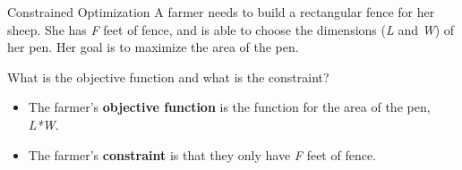 \documentclass{beamer}
\begin{document}
\begin{frame}{Constrained Optimization}
  A farmer needs to build a rectangular fence for her sheep. She has \textit{F} feet of fence, and is able to choose the dimensions (\textit{L} and \textit{W}) of her pen. Her goal is to maximize the area of the pen.

  \bigskip
  What is the objective function and what is the constraint?

  \pause
  \begin{itemize}
    \item The farmer's \textbf{objective function} is the function for the area of the pen, \textit{L*W}.
    \item The farmer's \textbf{constraint} is that they only have \textit{F} feet of fence.
  \end{itemize}
\end{frame}
\end{document}
